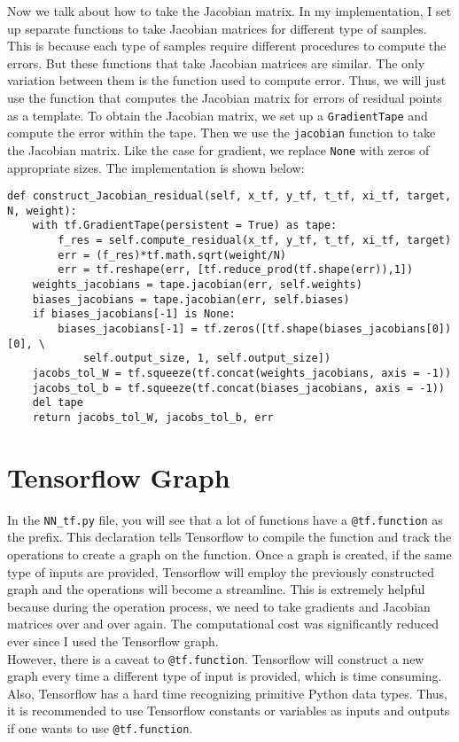 \documentclass{article}
\begin{document}
Now we talk about how to take the Jacobian matrix. In my implementation, I set up separate functions to take Jacobian matrices for different type of samples. This is because each type of samples require different procedures to compute the errors. But these functions that take Jacobian matrices are similar. The only variation between them is the function used to compute error. Thus, we will just use the function that computes the Jacobian matrix for errors of residual points as a template. To obtain the Jacobian matrix, we set up a \texttt{GradientTape} and compute the error within the tape. Then we use the \texttt{jacobian} function to take the Jacobian matrix. Like the case for gradient, we replace \texttt{None} with zeros of appropriate sizes. The implementation is shown below: 
\begin{lstlisting}
def construct_Jacobian_residual(self, x_tf, y_tf, t_tf, xi_tf, target, N, weight):
	with tf.GradientTape(persistent = True) as tape:
		f_res = self.compute_residual(x_tf, y_tf, t_tf, xi_tf, target)
		err = (f_res)*tf.math.sqrt(weight/N)
		err = tf.reshape(err, [tf.reduce_prod(tf.shape(err)),1])
	weights_jacobians = tape.jacobian(err, self.weights)
	biases_jacobians = tape.jacobian(err, self.biases)
	if biases_jacobians[-1] is None:
		biases_jacobians[-1] = tf.zeros([tf.shape(biases_jacobians[0])[0], \
			self.output_size, 1, self.output_size])
	jacobs_tol_W = tf.squeeze(tf.concat(weights_jacobians, axis = -1))
	jacobs_tol_b = tf.squeeze(tf.concat(biases_jacobians, axis = -1))
	del tape
	return jacobs_tol_W, jacobs_tol_b, err
\end{lstlisting}

\section{Tensorflow Graph}
In the \texttt{NN\_tf.py} file, you will see that a lot of functions have a \texttt{@tf.function} as the prefix. This declaration tells Tensorflow to compile the function and track the operations to create a graph on the function. Once a graph is created, if the same type of inputs are provided, Tensorflow will employ the previously constructed graph and the operations will become a streamline. This is extremely helpful because during the operation process, we need to take gradients and Jacobian matrices over and over again. The computational cost was significantly reduced ever since I used the Tensorflow graph. \\

However, there is a caveat to \texttt{@tf.function}. Tensorflow will construct a new graph every time a different type of input is provided, which is time consuming. Also, Tensorflow has a hard time recognizing primitive Python data types. Thus, it is recommended to use Tensorflow constants or variables as inputs and outputs if one wants to use \texttt{@tf.function}.
\end{document}
